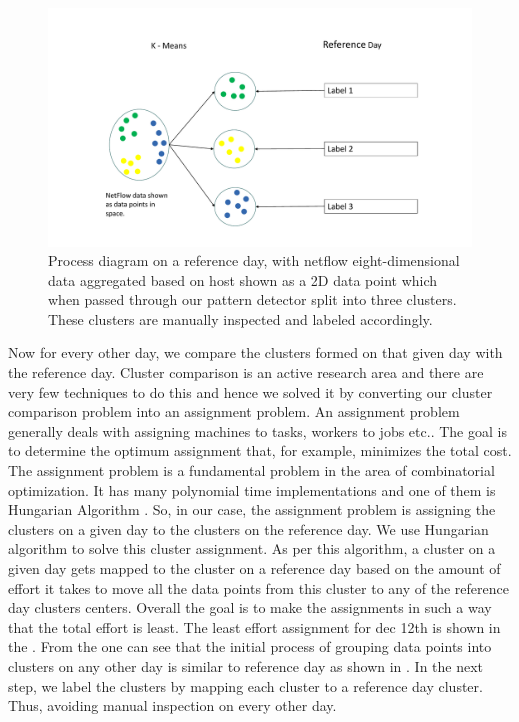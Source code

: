 \begin{figure}[b]
	\centerline{\includegraphics[scale = 0.5]{cluster_comp.pdf}}
	\caption{Process diagram on a reference day, with netflow eight-dimensional data aggregated based on host shown as a 2D data point which when passed through our pattern detector split into three clusters. These clusters are manually inspected and labeled accordingly. }%
\end{figure}

 Now for every other day, we compare the clusters formed on that given day with the reference day. Cluster comparison is an active research area and there are very few techniques to do this and hence we solved it by converting our cluster comparison problem into an assignment problem. An assignment problem generally deals with assigning machines to tasks, workers to jobs etc.. The goal is to determine the optimum assignment that, for example, minimizes the total cost. The assignment problem is a fundamental problem in the area of combinatorial optimization. It has many polynomial time implementations and one of them is Hungarian Algorithm \cite{kuhn1955hungarian}. So, in our case, the assignment problem is assigning the clusters on a given day to the clusters on the reference day. We use Hungarian algorithm to solve this cluster assignment. As per this algorithm, a cluster on a given day gets mapped to the cluster on a reference day based on the amount of effort it takes to move all the data points from this cluster to any of the reference day clusters centers. Overall the goal is to make the assignments in such a way that the total effort is least. The least effort assignment for dec 12th is shown in the . From the   one can see that the initial process of grouping data points into clusters on any other day is similar to reference day as shown in . In the next step, we label the clusters by mapping each cluster to a reference day cluster. Thus, avoiding manual inspection on every other day.
 
